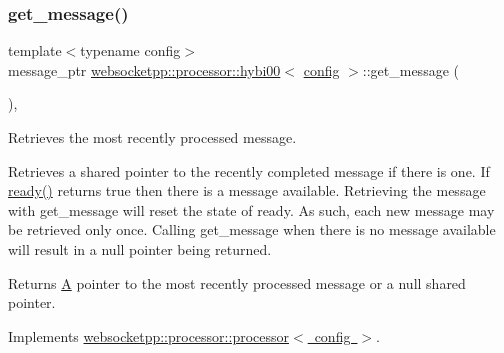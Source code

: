 \subsubsection{\texorpdfstring{get\+\_\+message()}{get\_message()}}
{\footnotesize\ttfamily template$<$typename config$>$ \\
message\+\_\+ptr \mbox{\hyperlink{classwebsocketpp_1_1processor_1_1hybi00}{websocketpp\+::processor\+::hybi00}}$<$ \mbox{\hyperlink{classconfig}{config}} $>$\+::get\+\_\+message (\begin{DoxyParamCaption}{ }\end{DoxyParamCaption})\hspace{0.3cm}{\ttfamily [inline]}, {\ttfamily [virtual]}}



Retrieves the most recently processed message. 

Retrieves a shared pointer to the recently completed message if there is one. If \mbox{\hyperlink{classwebsocketpp_1_1processor_1_1hybi00_a8a0ebdb322dad95ea3c7aee8e5c56b9a}{ready()}} returns true then there is a message available. Retrieving the message with get\+\_\+message will reset the state of ready. As such, each new message may be retrieved only once. Calling get\+\_\+message when there is no message available will result in a null pointer being returned.

\begin{DoxyReturn}{Returns}
\mbox{\hyperlink{struct_a}{A}} pointer to the most recently processed message or a null shared pointer. 
\end{DoxyReturn}


Implements \mbox{\hyperlink{classwebsocketpp_1_1processor_1_1processor_afb9477aa9e49a7dca59d684277b66932}{websocketpp\+::processor\+::processor$<$ config $>$}}.

\mbox{\label{classwebsocketpp_1_1processor_1_1hybi00_a907203cad667afdf85359b6ebb68a866}} 
